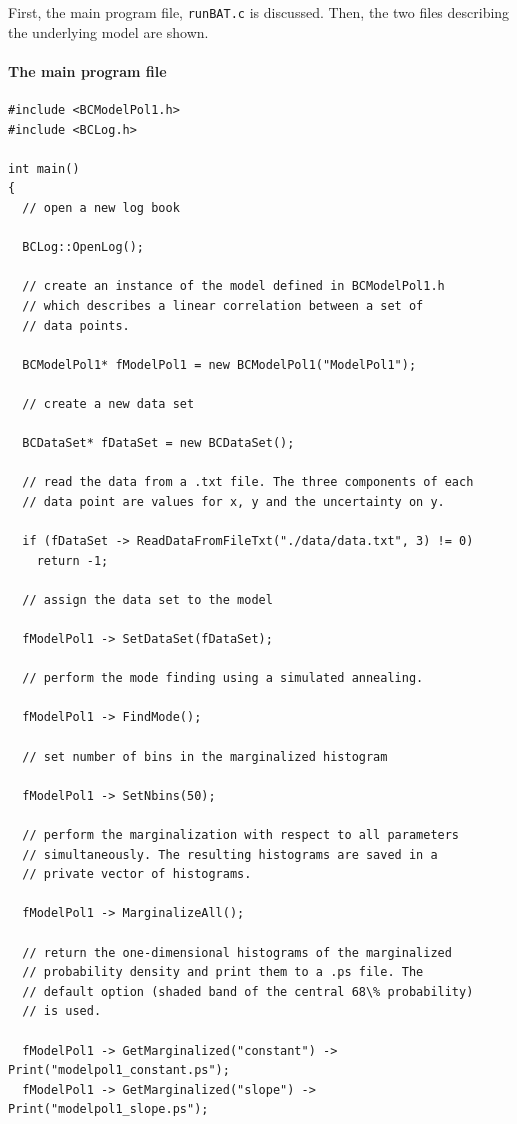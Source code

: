 \documentclass[11pt, a4paper]{article}
\begin{document}
\noindent 
First, the main program file, \verb|runBAT.c| is discussed. Then, the
two files describing the underlying model are shown. \\ 

\pagebreak 

\paragraph{The main program file} 
% 
\begin{small} 
\begin{verbatim}
#include <BCModelPol1.h>
#include <BCLog.h> 

int main()
{
  // open a new log book 

  BCLog::OpenLog(); 

  // create an instance of the model defined in BCModelPol1.h 
  // which describes a linear correlation between a set of 
  // data points. 

  BCModelPol1* fModelPol1 = new BCModelPol1("ModelPol1"); 

  // create a new data set 

  BCDataSet* fDataSet = new BCDataSet(); 

  // read the data from a .txt file. The three components of each 
  // data point are values for x, y and the uncertainty on y. 

  if (fDataSet -> ReadDataFromFileTxt("./data/data.txt", 3) != 0)
    return -1; 

  // assign the data set to the model 

  fModelPol1 -> SetDataSet(fDataSet); 

  // perform the mode finding using a simulated annealing. 

  fModelPol1 -> FindMode(); 

  // set number of bins in the marginalized histogram 

  fModelPol1 -> SetNbins(50);

  // perform the marginalization with respect to all parameters 
  // simultaneously. The resulting histograms are saved in a 
  // private vector of histograms. 

  fModelPol1 -> MarginalizeAll();

  // return the one-dimensional histograms of the marginalized 
  // probability density and print them to a .ps file. The 
  // default option (shaded band of the central 68\% probability) 
  // is used. 

  fModelPol1 -> GetMarginalized("constant") -> Print("modelpol1_constant.ps");
  fModelPol1 -> GetMarginalized("slope") -> Print("modelpol1_slope.ps");


\end{verbatim}
\end{small}
\end{document}

